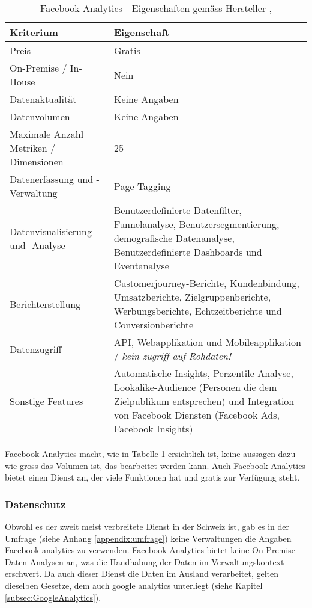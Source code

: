 \begin{table}[h]
	\centering
	\begin{tabular}{ | p{4cm} | p{10cm} |}
		\hline
		\textbf{Kriterium} & \textbf{Eigenschaft}  \\ 
		\hline
    Preis & Gratis \\
    \hline
    On-Premise / In-House & Nein \\
    \hline
    Datenaktualität & Keine Angaben \\
    \hline
		Datenvolumen & Keine Angaben \\
    \hline
    Maximale Anzahl Metriken / Dimensionen & 25 \\
    \hline
		Datenerfassung und -Verwaltung &  Page Tagging \\
    \hline
    Datenvisualisierung und -Analyse & Benutzerdefinierte Datenfilter, Funnelanalyse, Benutzersegmentierung,  demografische Datenanalyse, Benutzerdefinierte Dashboards und Eventanalyse \\
    \hline
    Berichterstellung & Customerjourney-Berichte, Kundenbindung, Umsatzberichte, Zielgruppenberichte, Werbungsberichte, Echtzeitberichte und Conversionberichte \\
    \hline
    Datenzugriff & API, Webapplikation und Mobileapplikation / \textit{kein zugriff auf Rohdaten!}\\
    \hline
    Sonstige Features & Automatische Insights, Perzentile-Analyse, Lookalike-Audience (Personen die dem Zielpublikum entsprechen) und Integration von Facebook Diensten (Facebook Ads, Facebook Insights) \\
		\hline  
	\end{tabular}
	\caption{Facebook Analytics - Eigenschaften gemäss Hersteller \parencite{facebookAnalyticsFeatures}, \parencite{facebookAnalyticsHelp}}
	\label{tab: facebookAnalyticsFeatures}
\end{table}

Facebook Analytics macht, wie in Tabelle \ref{tab: facebookAnalyticsFeatures} ersichtlich ist, keine aussagen dazu wie gross das Volumen ist, das bearbeitet werden kann. 
Auch Facebook Analytics bietet einen Dienst an, der viele Funktionen hat und gratis zur Verfügung steht. 

\subsubsection{Datenschutz}
Obwohl es der zweit meist verbreitete Dienst in der Schweiz ist, gab es in der Umfrage (siehe Anhang \ref{appendix:umfrage}) keine Verwaltungen die Angaben Facebook analytics zu verwenden. Facebook Analytics bietet keine On-Premise Daten Analysen an, was die Handhabung der Daten im Verwaltungskontext erschwert. Da auch dieser Dienst die Daten im Ausland verarbeitet, gelten dieselben Gesetze, dem auch google analytics unterliegt (siehe Kapitel \ref{subsec:GoogleAnalytics}). 

